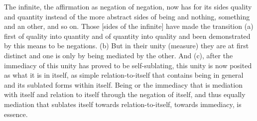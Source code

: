 The infinite, the affirmation as negation of negation,
now has for its sides quality and quantity
instead of the more abstract sides of being and nothing,
something and an other, and so on.
Those [sides of the infinite] have made the transition
(a) first of quality into quantity
and of quantity into quality
and been demonstrated by this means to be negations.
(b) But in their unity (measure)
they are at first distinct
and one is only by being mediated by the other.
And (c), after the immediacy of this unity
has proved to be self-sublating,
this unity is now posited as what it is in itself,
as simple relation-to-itself that contains
being in general and its sublated forms within itself.
Being or the immediacy that is mediation with itself
and relation to itself through the negation of itself,
and thus equally mediation that sublates itself
towards relation-to-itself, towards immediacy, is essence.
